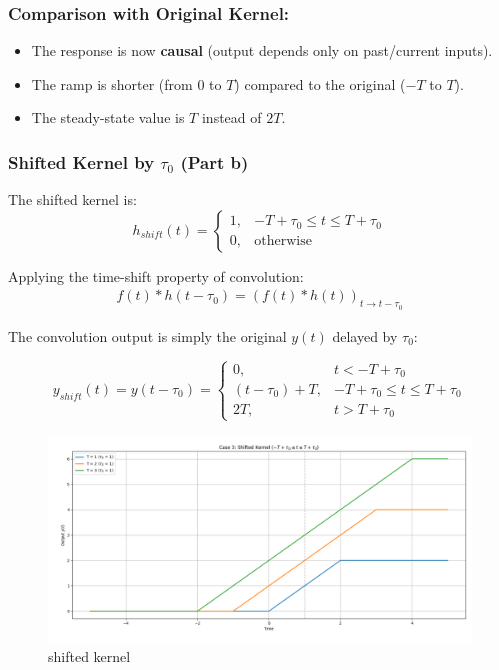 \subsubsection{Comparison with Original Kernel:}
\begin{itemize}
    \item The response is now \textbf{causal} (output depends only on past/current inputs).
    \item The ramp is shorter (from \( 0 \) to \( T \)) compared to the original (\( -T \) to \( T \)).
    \item The steady-state value is \( T \) instead of \( 2T \).
\end{itemize}

\subsubsection{Shifted Kernel by \( \tau_0 \) (Part b)}

The shifted kernel is:
\begin{equation}
h_{shift}(t) = 
\begin{cases} 
1, & -T + \tau_0 \leq t \leq T + \tau_0 \\
0, & \text{otherwise}
\end{cases}
\end{equation}

Applying the time-shift property of convolution:
\begin{align}
f(t) * h(t-\tau_0) = (f(t) * h(t))_{t \rightarrow t-\tau_0}
\end{align}

The convolution output is simply the original \( y(t) \) delayed by \( \tau_0 \):

\begin{equation}
y_{shift}(t) = y(t - \tau_0) = 
\begin{cases} 
0, & t < -T + \tau_0 \\
(t - \tau_0) + T, & -T + \tau_0 \leq t \leq T + \tau_0 \\
2T, & t > T + \tau_0 
\end{cases}
\end{equation}
\begin{figure}[H]
    \centering
    \includegraphics[width=0.8\linewidth]{codes/codes_step/plotsstep/case3step.png}
    \caption{shifted kernel}
    \label{fig:enter-label}
\end{figure}

